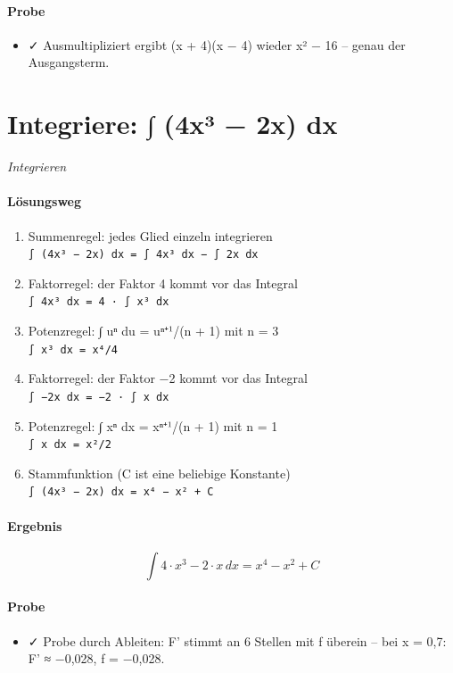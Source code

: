 \documentclass[11pt,a4paper]{article}
\begin{document}
\paragraph{Probe}
\begin{itemize}
  \item ✓ Ausmultipliziert ergibt (x + 4)(x − 4) wieder x² − 16 – genau der Ausgangsterm.
\end{itemize}
\section*{Integriere: ∫ (4x³ − 2x) dx}
\textit{Integrieren}

\paragraph{Lösungsweg}
\begin{enumerate}
  \item Summenregel: jedes Glied einzeln integrieren\\
  \texttt{∫ (4x³ − 2x) dx = ∫ 4x³ dx − ∫ 2x dx}
  \item Faktorregel: der Faktor 4 kommt vor das Integral\\
  \texttt{∫ 4x³ dx = 4 · ∫ x³ dx}
  \item Potenzregel: ∫ uⁿ du = uⁿ⁺¹/(n + 1) mit n = 3\\
  \texttt{∫ x³ dx = x⁴/4}
  \item Faktorregel: der Faktor −2 kommt vor das Integral\\
  \texttt{∫ −2x dx = −2 · ∫ x dx}
  \item Potenzregel: ∫ xⁿ dx = xⁿ⁺¹/(n + 1) mit n = 1\\
  \texttt{∫ x dx = x²/2}
  \item Stammfunktion (C ist eine beliebige Konstante)\\
  \texttt{∫ (4x³ − 2x) dx = x⁴ − x² + C}
\end{enumerate}
\paragraph{Ergebnis}
\[ \int 4 \cdot x^{3} - 2 \cdot x\,dx = x^{4} - x^{2} + C \]
\paragraph{Probe}
\begin{itemize}
  \item ✓ Probe durch Ableiten: F' stimmt an 6 Stellen mit f überein – bei x = 0,7: F' ≈ −0,028, f = −0,028.
\end{itemize}
\end{document}
